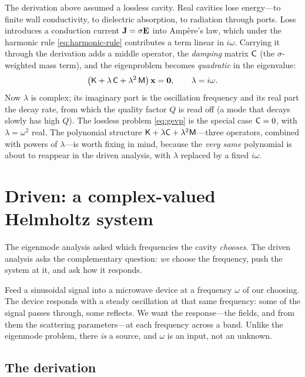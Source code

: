 The derivation above assumed a lossless cavity. Real cavities lose energy---to
finite wall conductivity, to dielectric absorption, to radiation through ports.
Loss introduces a conduction current $\mathbf{J}=\sigma\mathbf{E}$ into Amp\`ere's law, which
under the harmonic rule \cref{eq:harmonic-rule} contributes a term linear in
$i\omega$. Carrying it through the derivation adds a middle operator, the
\emph{damping} matrix $\mathsf{C}$ (the $\sigma$-weighted mass term), and the
eigenproblem becomes \emph{quadratic} in the eigenvalue:
\begin{equation}
  \bigl(\mathsf{K} + \lambda\,\mathsf{C} + \lambda^2\,\mathsf{M}\bigr)\,\mathbf{x} = \mathbf 0,
  \qquad \lambda = i\omega.
  \label{eq:qevp}
\end{equation}
Now $\lambda$ is complex; its imaginary part is the oscillation frequency and its
real part the decay rate, from which the quality factor $Q$ is read off (a mode
that decays slowly has high $Q$). The lossless problem \cref{eq:gevp} is the
special case $\mathsf{C}=0$, with $\lambda=\omega^2$ real. The polynomial structure
$\mathsf{K}+\lambda\mathsf{C}+\lambda^2\mathsf{M}$---three operators, combined with powers of
$\lambda$---is worth fixing in mind, because the \emph{very same} polynomial is
about to reappear in the driven analysis, with $\lambda$ replaced by a fixed
$i\omega$.

\section{Driven: a complex-valued Helmholtz system}
\label{sec:driven}

The eigenmode analysis asked which frequencies the cavity \emph{chooses}. The
driven analysis asks the complementary question: \emph{we} choose the frequency,
push the system at it, and ask how it responds.

\begin{physicsbox}
Feed a sinusoidal signal into a microwave device at a frequency $\omega$ of our
choosing. The device responds with a steady oscillation at that same frequency:
some of the signal passes through, some reflects. We want the response---the
fields, and from them the scattering parameters---at each frequency across a
band. Unlike the eigenmode problem, there \emph{is} a source, and $\omega$ is an
input, not an unknown.
\end{physicsbox}

\subsection{The derivation}

